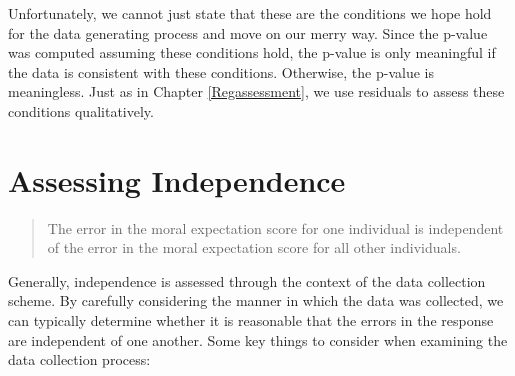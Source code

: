 \documentclass[]{book}
\theoremstyle{plain}
\theoremstyle{mydefn}
\theoremstyle{myexmpl}
\theoremstyle{remark}
\begin{document}
Unfortunately, we cannot just state that these are the conditions we
hope hold for the data generating process and move on our merry way.
Since the p-value was computed assuming these conditions hold, the
p-value is only meaningful if the data is consistent with these
conditions. Otherwise, the p-value is meaningless. Just as in Chapter
\ref{Regassessment}, we use residuals to assess these conditions
qualitatively.

\section{Assessing Independence}\label{assessing-independence-1}

\begin{quote}
The error in the moral expectation score for one individual is
independent of the error in the moral expectation score for all other
individuals.
\end{quote}

Generally, independence is assessed through the context of the data
collection scheme. By carefully considering the manner in which the data
was collected, we can typically determine whether it is reasonable that
the errors in the response are independent of one another. Some key
things to consider when examining the data collection process:
\end{document}
